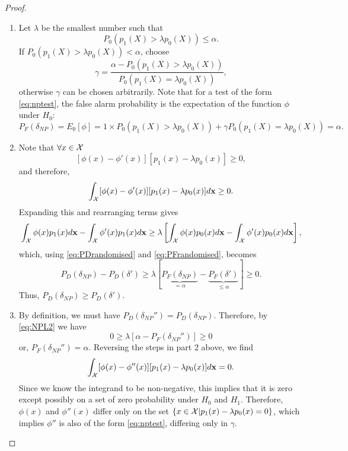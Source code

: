 \begin{proof}

\begin{enumerate}
\item Let $\lambda$ be the smallest number such that 
\begin{equation}
P_0(p_1(X)>\lambda p_0(X)) \leq \alpha.
\end{equation}
If $P_0(p_1(X)>\lambda p_0(X)) < \alpha$, choose 
\begin{equation}
\gamma=\frac{\alpha-P_0(p_1(X)>\lambda p_0(X))}{P_0(p_1(X)=\lambda p_0(X))},
\end{equation}
otherwise $\gamma$ can be chosen arbitrarily. Note that for a test of the form \ref{eq:nptest}, the false alarm probability is the expectation of the function $\phi$ under $H_0$:
\begin{equation}
P_F(\delta_{NP})=E_0[\phi]=1\times P_0(p_1(X)>\lambda p_0(X))+\gamma P_0(p_1(X)=\lambda p_0(X)) =\alpha.
\end{equation}
\item Note that $\forall x \in \mathcal{X}$
\[ [\phi(x) - \phi'(x)][p_1(x)-\lambda p_0(x)]\geq 0, \]
and therefore,
\begin{equation}
\int_{\mathcal{X}} [\phi(x) - \phi'(x)][p_1(x)-\lambda p_0(x)] d\mathbf{x} \geq 0.
\end{equation}
Expanding this and rearranging terms gives 
\begin{equation}
\int_{\mathcal{X}}\phi(x) p_1(x) d\mathbf{x} - \int_{\mathcal{X}}\phi'(x) p_1(x) d\mathbf{x} \geq \lambda \left[ \int_{\mathcal{X}} \phi(x)p_0(x) d\mathbf{x} - \int_{\mathcal{X}}\phi'(x)p_0(x) d\mathbf{x} \right],
\end{equation}
which, using \ref{eq:PDrandomised} and \ref{eq:PFrandomised}, becomes
\begin{equation}\label{eq:NPL2}
P_D(\delta_{NP}) - P_D(\delta') \geq \lambda \left[\underbrace{P_F(\delta_{NP})}_{=\alpha} - \underbrace{P_F(\delta')}_{\leq \alpha} \right]\geq 0.
\end{equation}
Thus, $P_D(\delta_{NP}) \geq P_D(\delta')$. 
\item By definition, we must have $P_D(\delta_{NP}'')=P_D(\delta_{NP})$. Therefore, by \ref{eq:NPL2} we have
\begin{equation}
0 \geq \lambda \left[ \alpha - P_F(\delta_{NP}'') \right]\geq 0
\end{equation}
or, $P_F(\delta_{NP}'')=\alpha$. Reversing the steps in part 2 above, we find
\begin{equation}
\int_{\mathcal{X}} [\phi(x) - \phi''(x)][p_1(x)-\lambda p_0(x)] d\mathbf{x} = 0.
\end{equation}
Since we know the integrand to be non-negative, this implies that it is zero except possibly on a set of zero probability under $H_0$ and $H_1$. Therefore, $\phi(x)$ and $\phi''(x)$ differ only on the set $\{x \in \mathcal{X} | p_1(x)-\lambda p_0(x)=0 \}$, which implies $\phi''$ is also of the form \ref{eq:nptest}, differing only in $\gamma$.
\end{enumerate}
\end{proof}

